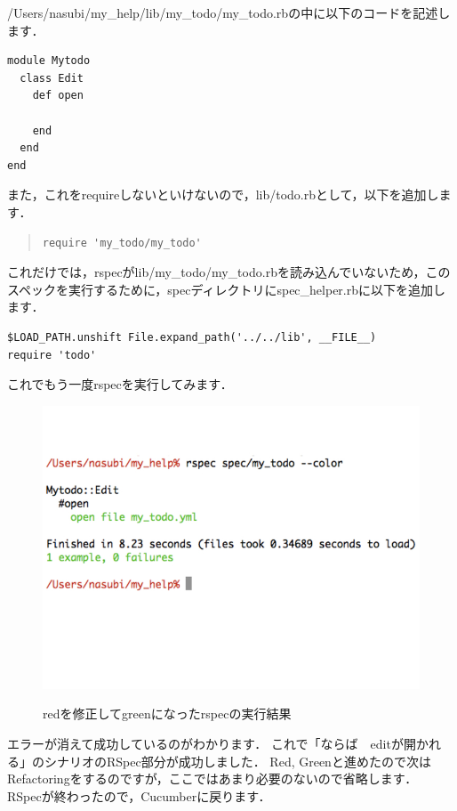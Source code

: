 /Users/nasubi/my\_help/lib/my\_todo/my\_todo.rbの中に以下のコードを記述します．
\begin{lstlisting}[style=customCsh,basicstyle={\scriptsize\ttfamily}]
module Mytodo
  class Edit
    def open

    end
  end
end
\end{lstlisting}
また，これをrequireしないといけないので，lib/todo.rbとして，以下を追加します．
\begin{quote}\begin{verbatim}
require 'my_todo/my_todo'
\end{verbatim}\end{quote}
これだけでは，rspecがlib/my\_todo/my\_todo.rbを読み込んでいないため，このスペックを実行するために，specディレクトリにspec\_helper.rbに以下を追加します．
\begin{lstlisting}[style=customCsh,basicstyle={\scriptsize\ttfamily}]
$LOAD_PATH.unshift File.expand_path('../../lib', __FILE__)
require 'todo'
\end{lstlisting}
これでもう一度rspecを実行してみます．

\begin{figure}[htbp]\begin{center}
\includegraphics[width=12cm,bb= 0 0 937 753]{../figs/./rspec01.001.jpg}
\caption{redを修正してgreenになったrspecの実行結果}
\label{fig:rspec01}
\label{default}\end{center}\end{figure}
エラーが消えて成功しているのがわかります．
これで「ならば　editが開かれる」のシナリオのRSpec部分が成功しました．
Red, Greenと進めたので次はRefactoringをするのですが，ここではあまり必要のないので省略します．
RSpecが終わったので，Cucumberに戻ります．

